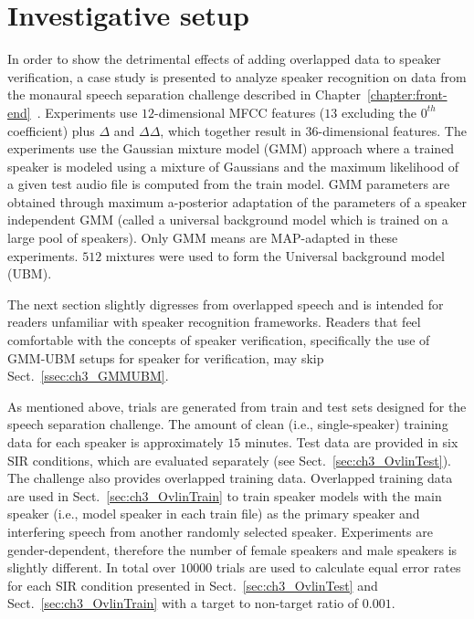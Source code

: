 \section{Investigative setup}
\label{sec:ch3_SIDintro}
In order to show the detrimental effects of adding overlapped data to speaker verification, a case study is presented to analyze speaker recognition on data from the monaural speech separation challenge described in Chapter~\ref{chapter:front-end}~\cite{cooke20101}. 
Experiments use $12$-dimensional MFCC features ($13$ excluding the $0^{th}$ coefficient) plus $\Delta$ and $\Delta\Delta$, which together result in $36$-dimensional features. 
The experiments use the Gaussian mixture model (GMM) approach where a trained speaker is modeled using a mixture of Gaussians and the maximum likelihood of a given test audio file is computed from the train model. 
GMM parameters are obtained through maximum a-posterior adaptation of the parameters of a speaker independent GMM (called a universal background model which is trained on a large pool of speakers). 
Only GMM means are MAP-adapted in these experiments. 
$512$ mixtures were used to form the Universal background model (UBM). 

The next section slightly digresses from overlapped speech and is intended for readers unfamiliar with speaker recognition frameworks. 
Readers that feel comfortable with the concepts of speaker verification, specifically the use of GMM-UBM setups for speaker for verification, may skip Sect.~\ref{ssec:ch3_GMMUBM}.

As mentioned above, trials are generated from train and test sets designed for the speech separation challenge. 
The amount of clean (i.e., single-speaker) training data for each speaker is approximately $15$ minutes. 
Test data are provided in six SIR conditions, which are evaluated separately (see Sect.~\ref{sec:ch3_OvlinTest}). 
The challenge also provides overlapped training data. 
Overlapped training data are used in Sect.~\ref{sec:ch3_OvlinTrain} to train speaker models with the main speaker (i.e., model speaker in each train file) as the primary speaker and interfering speech from another randomly selected speaker. 
Experiments are gender-dependent, therefore the number of female speakers and male speakers is slightly different. 
In total over $10000$ trials are used to calculate equal error rates for each SIR condition presented in Sect.~\ref{sec:ch3_OvlinTest} and Sect.~\ref{sec:ch3_OvlinTrain} with a target to non-target ratio of $0.001$. 

